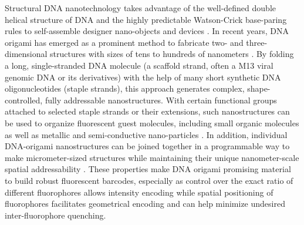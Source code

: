 Structural DNA nanotechnology takes advantage of the well-defined double 
helical structure of DNA and the highly predictable Watson-Crick base-paring rules to 
self-assemble designer nano-objects and devices \citep{seeman_nucleic_1982,aldaye_assembling_2008,lin_designer_2009,nangreave_dna_2010,shih_knitting_2010,trring_dna_2011}. In recent years, DNA origami has 
emerged as a prominent method to fabricate two- and three-dimensional structures with 
sizes of tens to hundreds of nanometers \citep{rothemund_folding_2006,douglas_self-assembly_2009,dietz_folding_2009,ke_multilayer_2009,andersen_self-assembly_2009,han_folding_2010,liedl_self-assembly_2010,han_dna_2011}. By folding a long, single-stranded DNA 
molecule (a scaffold strand, often a M13 viral genomic DNA or its derivatives) 
with the help of many short synthetic DNA oligonucleotides (staple strands), this 
approach generates complex, shape-controlled, fully addressable nanostructures. With 
certain functional groups attached to selected staple strands or their extensions, such 
nanostructures can be used to organize fluorescent guest molecules, including small 
organic molecules \citep{jungmann_single-molecule_2010,steinhauer_dna_2009,lund_molecular_2010} as well as metallic \citep{pal_dna-origami-directed_2010} and semi-conductive nano-particles \citep{bui_programmable_2010}. In 
addition, individual DNA-origami nanostructures can be joined together in a 
programmable way to make micrometer-sized structures while maintaining their unique 
nanometer-scale spatial addressability \citep{liu_crystalline_2011,woo_programmable_2011}. These properties make DNA origami 
promising material to build robust fluorescent barcodes, especially as control over the exact ratio of 
different fluorophores allows intensity encoding while spatial positioning of fluorophores 
facilitates geometrical encoding and can help minimize undesired inter-fluorophore 
quenching. 

